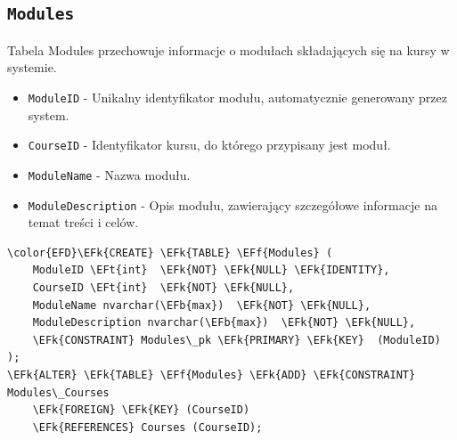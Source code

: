 \documentclass[11pt]{article}
\newcommand{\EFk}[1]{\textcolor{EFk}{\textbf{#1}}} %
\newcommand{\EFb}[1]{\textcolor{EFb}{\textbf{#1}}} %
\newcommand{\EFf}[1]{\textcolor{EFf}{#1}} %
\newcommand{\EFt}[1]{\textcolor{EFt}{\textbf{#1}}} %
\begin{document}
\subsection{\texttt{Modules}}
\label{sec:org92e21a9}
Tabela Modules przechowuje informacje o modułach składających się na kursy w systemie.
\begin{itemize}
\item \texttt{ModuleID} - Unikalny identyfikator modułu, automatycznie generowany przez system.
\item \texttt{CourseID} - Identyfikator kursu, do którego przypisany jest moduł.
\item \texttt{ModuleName} - Nazwa modułu.
\item \texttt{ModuleDescription} - Opis modułu, zawierający szczegółowe informacje na temat treści i celów.
\end{itemize}
\begin{Code}
\begin{Verbatim}
\color{EFD}\EFk{CREATE} \EFk{TABLE} \EFf{Modules} (
    ModuleID \EFt{int}  \EFk{NOT} \EFk{NULL} \EFk{IDENTITY},
    CourseID \EFt{int}  \EFk{NOT} \EFk{NULL},
    ModuleName nvarchar(\EFb{max})  \EFk{NOT} \EFk{NULL},
    ModuleDescription nvarchar(\EFb{max})  \EFk{NOT} \EFk{NULL},
    \EFk{CONSTRAINT} Modules\_pk \EFk{PRIMARY} \EFk{KEY}  (ModuleID)
);
\EFk{ALTER} \EFk{TABLE} \EFf{Modules} \EFk{ADD} \EFk{CONSTRAINT} Modules\_Courses
    \EFk{FOREIGN} \EFk{KEY} (CourseID)
    \EFk{REFERENCES} Courses (CourseID);
\end{Verbatim}
\end{Code}
\end{document}
